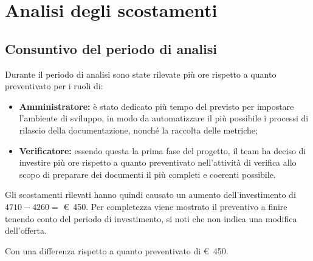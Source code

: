\section{Analisi degli scostamenti}

\subsection{Consuntivo del periodo di analisi}
    \label{section:consultivo_analisi}
    Durante il periodo di analisi sono state rilevate più ore rispetto a quanto preventivato per i ruoli di:

    \begin{itemize}
        \item \textbf{Amministratore:} è stato dedicato più tempo del previsto per impostare l'ambiente di sviluppo, in modo da automatizzare il più possibile i processi di rilascio della documentazione, nonché la raccolta delle metriche;
        \item \textbf{Verificatore:} essendo questa la prima fase del progetto, il team ha deciso di investire più ore rispetto a quanto preventivato nell'attività di verifica allo scopo di preparare dei documenti il più completi e coerenti possibile.
    \end{itemize}

    \def\salarycontent{
        {Amministratore,$49+\noexpand\textbf{15}=64$,20,1280},
        {Analista,44,25,1100},
        {Progettista,20,22,440},
        {Programmatore,0,15,0},
        {Responsabile,26,30,780},
        {Verificatore,$64+\noexpand\textbf{10}=74$,15,1110},
        {Totale,203,127,4710},
    }
    
    \noindent Gli scostamenti rilevati hanno quindi causato un aumento dell'investimento di $4710 - 4260 =$ \euro\ 450.
    Per completezza viene mostrato il preventivo a finire tenendo conto del periodo di investimento, si noti che non indica una modifica dell'offerta.
    \def\salarycontent{
        {Amministratore,$103+\noexpand\textbf{15}$,20,2360},
        {Analista,85,25,2125},
        {Progettista,212,22,4664},
        {Programmatore,211,15,3165},
        {Responsabile,67,30,2010},
        {Verificatore,$260+\noexpand\textbf{10}$,15,4050},
        {Totale,938,127,18374},
    }
    
    \noindent Con una differenza rispetto a quanto preventivato di \euro\ 450.
